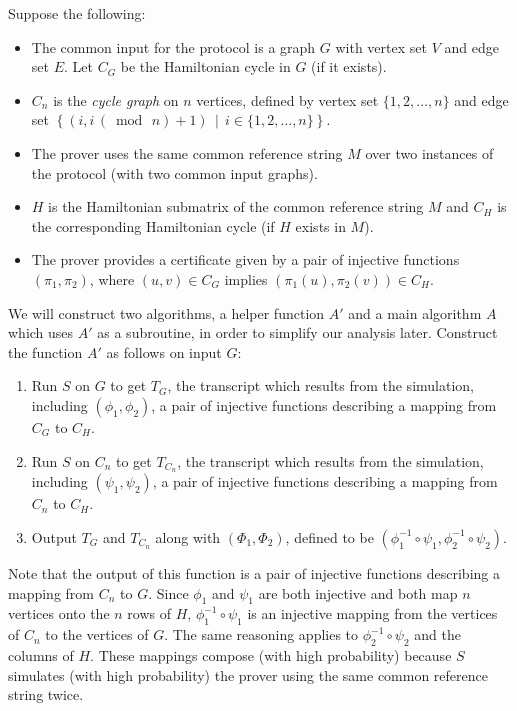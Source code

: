 \documentclass[draft]{article}
\renewcommand{\pmod}[1]{\,(\bmod{\,#1})}
\begin{document}
\begin{enumerate}
  Suppose the following:
  \begin{itemize}
  \item The common input for the protocol is a graph $G$ with vertex set $V$ and edge set $E$.
    Let $C_G$ be the Hamiltonian cycle in $G$ (if it exists).
  \item $C_n$ is the \emph{cycle graph} on $n$ vertices, defined by vertex set $\{1, 2, \ldots, n\}$ and edge set $\left\{(i, i \pmod{n} + 1)\,\middle|\, i\in \{1, 2, \ldots, n\}\right\}$.
  \item The prover uses the same common reference string $M$ over two instances of the protocol (with two common input graphs).
  \item $H$ is the Hamiltonian submatrix of the common reference string $M$ and $C_H$ is the corresponding Hamiltonian cycle (if $H$ exists in $M$).
  \item The prover provides a certificate given by a pair of injective functions $(\pi_1, \pi_2)$, where $(u, v)\in C_G$ implies $(\pi_1(u), \pi_2(v))\in C_H$.
  \end{itemize}
  We will construct two algorithms, a helper function $A'$ and a main algorithm $A$ which uses $A'$ as a subroutine, in order to simplify our analysis later.
  Construct the function $A'$ as follows on input $G$:
  \begin{enumerate}
  \item Run $S$ on $G$ to get $T_G$, the transcript which results from the simulation, including $(\phi_1, \phi_2)$, a pair of injective functions describing a mapping from $C_G$ to $C_H$.
  \item Run $S$ on $C_n$ to get $T_{C_n}$, the transcript which results from the simulation, including $(\psi_1, \psi_2)$, a pair of injective functions describing a mapping from $C_n$ to $C_H$.
  \item Output $T_G$ and $T_{C_n}$ along with $(\Phi_1, \Phi_2)$, defined to be $(\phi_1^{-1}\circ\psi_1, \phi_2^{-1}\circ\psi_2)$.
  \end{enumerate}
  Note that the output of this function is a pair of injective functions describing a mapping from $C_n$ to $G$.
  Since $\phi_1$ and $\psi_1$ are both injective and both map $n$ vertices onto the $n$ rows of $H$, $\phi_1^{-1}\circ\psi_1$ is an injective mapping from the vertices of $C_n$ to the vertices of $G$.
  The same reasoning applies to $\phi_2^{-1}\circ\psi_2$ and the columns of $H$.
  These mappings compose (with high probability) because $S$ simulates (with high probability) the prover using the same common reference string twice.


\end{enumerate}
\end{document}
